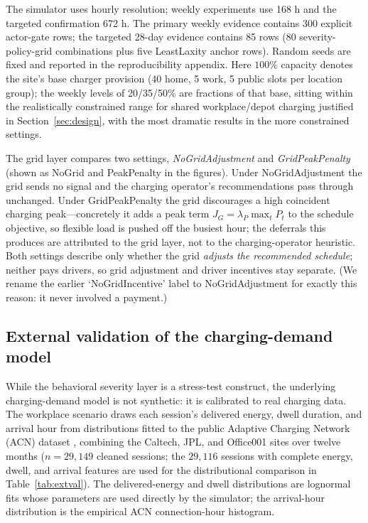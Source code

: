 \documentclass[12pt]{article}
\begin{document}
The simulator uses hourly resolution; weekly experiments use 168 h and the targeted confirmation 672 h. The primary weekly evidence contains 300 explicit actor-gate rows; the targeted 28-day evidence contains 85 rows (80 severity-policy-grid combinations plus five LeastLaxity anchor rows). Random seeds are fixed and reported in the reproducibility appendix. Here $100\%$ capacity denotes the site's base charger provision (40 home, 5 work, 5 public slots per location group); the weekly levels of 20/35/50\% are fractions of that base, sitting within the realistically constrained range for shared workplace/depot charging justified in Section~\ref{sec:design}, with the most dramatic results in the more constrained settings.

The grid layer compares two settings, \emph{NoGridAdjustment} and \emph{GridPeakPenalty} (shown as \textsf{NoGrid} and \textsf{PeakPenalty} in the figures). Under NoGridAdjustment the grid sends no signal and the charging operator's recommendations pass through unchanged. Under GridPeakPenalty the grid discourages a high coincident charging peak---concretely it adds a peak term $J_G=\lambda_P\max_t P_t$ to the schedule objective, so flexible load is pushed off the busiest hour; the deferrals this produces are attributed to the grid layer, not to the charging-operator heuristic. Both settings describe only whether the grid \emph{adjusts the recommended schedule}; neither pays drivers, so grid adjustment and driver incentives stay separate. (We rename the earlier `NoGridIncentive' label to NoGridAdjustment for exactly this reason: it never involved a payment.)

\subsection{External validation of the charging-demand model}\label{sec:extval}

While the behavioral severity layer is a stress-test construct, the underlying charging-demand model is not synthetic: it is calibrated to real charging data. The workplace scenario draws each session's delivered energy, dwell duration, and arrival hour from distributions fitted to the public Adaptive Charging Network (ACN) dataset \cite{acndata2019}, combining the Caltech, JPL, and Office001 sites over twelve months ($n=29{,}149$ cleaned sessions; the $29{,}116$ sessions with complete energy, dwell, and arrival features are used for the distributional comparison in Table~\ref{tab:extval}). The delivered-energy and dwell distributions are lognormal fits whose parameters are used directly by the simulator; the arrival-hour distribution is the empirical ACN connection-hour histogram.
\end{document}
